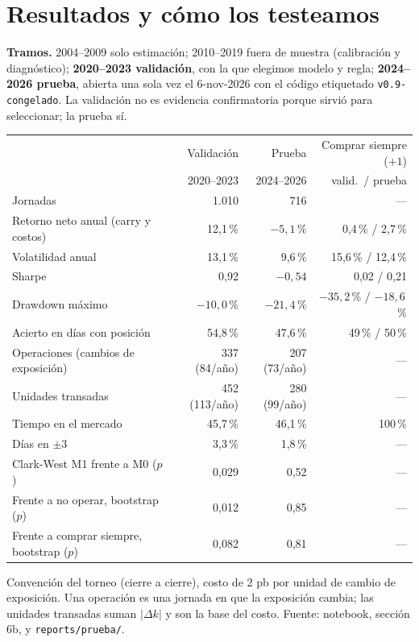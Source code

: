 \documentclass[11pt,a4paper]{article}
\begin{document}
\section{Resultados y cómo los testeamos}

\textbf{Tramos.} 2004--2009 solo estimación; 2010--2019 fuera de muestra (calibración y diagnóstico); \textbf{2020--2023 validación}, con la que elegimos modelo y regla; \textbf{2024--2026 prueba}, abierta una sola vez el 6-nov-2026 con el código etiquetado \texttt{v0.9-congelado}. La validación no es evidencia confirmatoria porque sirvió para seleccionar; la prueba sí.

\begin{table}[h]\centering\footnotesize
\begin{threeparttable}
\begin{tabular}{l rr r}
\toprule
 & Validación & Prueba & Comprar siempre ($+1$) \\
 & 2020--2023 & 2024--2026 & valid.\ / prueba \\
\midrule
Jornadas & 1.010 & 716 & --- \\
Retorno neto anual (carry y costos) & 12,1\,\% & $-5{,}1$\,\% & 0,4\,\% / 2,7\,\% \\
Volatilidad anual & 13,1\,\% & 9,6\,\% & 15,6\,\% / 12,4\,\% \\
Sharpe & 0,92 & $-0{,}54$ & 0,02 / 0,21 \\
Drawdown máximo & $-10{,}0$\,\% & $-21{,}4$\,\% & $-35{,}2$\,\% / $-18{,}6$\,\% \\
Acierto en días con posición & 54,8\,\% & 47,6\,\% & 49\,\% / 50\,\% \\
Operaciones (cambios de exposición) & 337 (84/año) & 207 (73/año) & --- \\
Unidades transadas & 452 (113/año) & 280 (99/año) & --- \\
Tiempo en el mercado & 45,7\,\% & 46,1\,\% & 100\,\% \\
Días en $\pm3$ & 3,3\,\% & 1,8\,\% & --- \\
Clark-West M1 frente a M0 ($p$) & 0,029 & 0,52 & --- \\
Frente a no operar, bootstrap ($p$) & 0,012 & 0,85 & --- \\
Frente a comprar siempre, bootstrap ($p$) & 0,082 & 0,81 & --- \\
\bottomrule
\end{tabular}
\begin{tablenotes}\footnotesize
\item Convención del torneo (cierre a cierre), costo de 2 pb por unidad de cambio de exposición. Una operación es una jornada en que la exposición cambia; las unidades transadas suman $|\Delta k|$ y son la base del costo. Fuente: notebook, sección 6b, y \texttt{reports/prueba/}.
\end{tablenotes}
\end{threeparttable}
\end{table}
\end{document}
